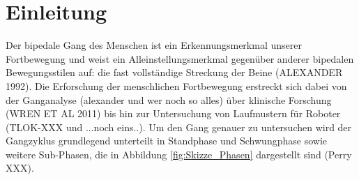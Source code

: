 \section{Einleitung}
Der bipedale Gang des Menschen ist ein Erkennungsmerkmal unserer Fortbewegung und weist ein Alleinstellungsmerkmal gegenüber anderer bipedalen Bewegungsstilen auf: die fast vollständige Streckung der Beine (ALEXANDER 1992). Die Erforschung der menschlichen Fortbewegung erstreckt sich dabei von der Ganganalyse (alexander und wer noch so alles) über klinische Forschung (WREN ET AL 2011) bis hin zur Untersuchung von Laufmustern für Roboter (TLOK-XXX und ...noch eins..).
Um den Gang genauer zu untersuchen wird der Gangzyklus grundlegend unterteilt in Standphase und Schwungphase sowie weitere Sub-Phasen, die in Abbildung \ref{fig:Skizze_Phasen} dargestellt sind (Perry XXX).\\

